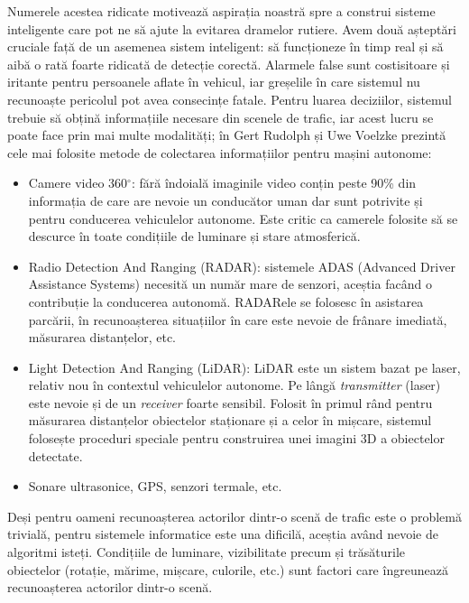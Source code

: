 Numerele acestea ridicate motivează aspirația noastră spre a construi sisteme inteligente care pot ne să ajute la evitarea dramelor rutiere. Avem două așteptări cruciale față de un asemenea sistem inteligent: să funcționeze în timp real și să aibă o rată foarte ridicată de detecție corectă. Alarmele false sunt costisitoare și iritante pentru persoanele aflate în vehicul, iar greșelile în care sistemul nu recunoaște pericolul pot avea consecințe fatale.\newline
Pentru luarea deciziilor, sistemul trebuie să obțină informațiile necesare din scenele de trafic, iar acest lucru se poate face prin mai multe modalități; în \cite{car_sensors}  Gert Rudolph și Uwe Voelzke prezintă cele mai folosite metode de colectarea informațiilor pentru mașini autonome:
\begin{itemize}
	\item Camere video 360$^\circ$: fără îndoială imaginile video conțin peste 90\% din informația de care are nevoie un conducător uman dar sunt potrivite și pentru conducerea vehiculelor autonome. Este critic ca camerele folosite să se descurce în toate condițiile de luminare și stare atmosferică.
	\item Radio Detection And Ranging (RADAR): sistemele ADAS (Advanced Driver Assistance Systems) necesită un număr mare de senzori, aceștia facând o contribuție la conducerea autonomă. RADARele se folosesc în asistarea parcării, în recunoașterea situațiilor în care este nevoie de frânare imediată, măsurarea distanțelor, etc.
	\item Light Detection And Ranging (LiDAR): LiDAR este un sistem bazat pe laser, relativ nou în contextul vehiculelor autonome. Pe lângă \textit{transmitter} (laser) este nevoie și de un \textit{receiver} foarte sensibil. Folosit în primul rând pentru măsurarea distanțelor obiectelor staționare și a celor în mișcare, sistemul folosește proceduri speciale pentru construirea unei imagini 3D a obiectelor detectate.
	\item Sonare ultrasonice, GPS, senzori termale, etc.
\end{itemize}
Deși pentru oameni recunoașterea actorilor dintr-o scenă de trafic este o problemă trivială, pentru sistemele informatice este una dificilă, aceștia având nevoie de algoritmi isteți. Condițiile de luminare, vizibilitate precum și trăsăturile obiectelor (rotație, mărime, mișcare, culorile, etc.) sunt factori care îngreunează recunoașterea actorilor dintr-o scenă.

